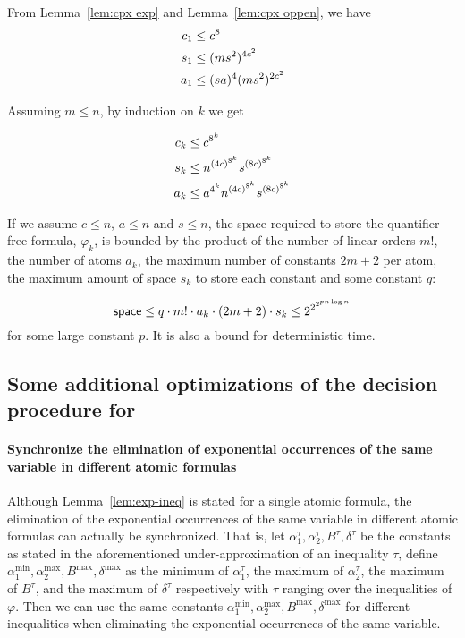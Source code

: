From Lemma~\ref{lem:cpx exp} and Lemma~\ref{lem:cpx oppen}, we have
\begin{align}
    c_1&\le c^8 \notag \\
    s_1&\le (ms^2)^{4c^2} \notag\\
    a_1&\le (sa)^4(ms^2)^{2c^2}\notag 
\end{align} 

Assuming $m\le n$, by induction on $k$ we get

\begin{lemma}
    \begin{align}
        c_k&\le c^{8^k} \notag \\
        s_k&\le n^{(4c)^{ 8^k}} s^{(8c)^{ 8^k}} \notag\\
        a_k&\le a^{4^k}n^{(4c)^{ 8^k}} s^{(8c)^{ 8^k}} \notag
    \end{align} 
\end{lemma}

If we assume $c\le n$, $a\le n$ and $s\le n$, the space required to store the quantifier free formula, $\varphi_k$, is bounded by the product of the number of linear orders $m!$, the number of atoms $a_k$, the maximum number of constants $2m+2$ per atom, the maximum amount of space $s_k$ to store each constant and some constant $q$:
 
$${\sf space}\le q \cdot m! \cdot a_k \cdot (2m+2) \cdot s_k \le 2^{2^{2^{pn \log n}}}$$
for some large constant $p$. It is also a bound for deterministic time.

\subsection{Some additional optimizations of the decision procedure for {\paexp}}\label{app-opt}

\paragraph{Synchronize the elimination of exponential occurrences of the same variable in different atomic formulas}

Although Lemma~\ref{lem:exp-ineq} is stated for a single atomic formula, the elimination of the exponential occurrences of the same variable in different atomic formulas can actually be synchronized. That is,  let $\alpha^\tau_{1}, \alpha^\tau_{2}, B^\tau, \delta^\tau$ be the constants as stated in the aforementioned under-approximation of an inequality $\tau$, define $\alpha^{\min}_1, \alpha^{\max}_2, B^{\max}, \delta^{\max}$ as the minimum of $\alpha^\tau_1$, the maximum of $\alpha^\tau_2$, the maximum of $B^\tau$, and the maximum of $\delta^\tau$ respectively with $\tau$ ranging over the inequalities of $\varphi$. Then we can use the same constants $\alpha^{\min}_1, \alpha^{\max}_2, B^{\max}, \delta^{\max}$ for different inequalities when eliminating the exponential occurrences of the same variable. 


